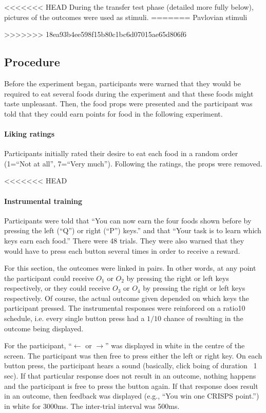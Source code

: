 \documentclass[12pt]{article}
\begin{document}
<<<<<<< HEAD
During the transfer test phase (detailed more fully below), pictures of the
outcomes were used as stimuli. 
=======
Pavlovian stimuli

>>>>>>> 18ea93b4ee598f15b80c1bc6d07015ae65d806f6

\subsection{Procedure}
Before the experiment began, participants were warned that they would be
required to eat several foods during the experiment and that these foods might
taste unpleasant. Then, the food props were presented and the participant was
told that they could earn points for food in the following experiment.

\paragraph{Liking ratings} Participants initially rated their desire to eat
each food in a random order (1=``Not at all'', 7=``Very much''). Following the
ratings, the props were removed. 

<<<<<<< HEAD
\paragraph{Instrumental training} Participants were told that ``You can now
earn the four foods shown before by pressing the left (``Q'') or right (``P'')
keys.'' and that ``Your task is to learn which keys earn each food.'' There were
48 trials. They were also warned that they would have to press each button several times in order to receive a reward. 

For this section, the outcomes were linked in pairs. In other words, at any point the participant could receive $O_1$ or $O_2$ by pressing the right or left keys respectively, or they could receive $O_3$ or $O_4$ by pressing the right or left keys respectively. Of course, the actual outcome given depended on which keys the participant pressed. The instrumental responses were reinforced on a ratio10 schedule, i.e. every single button press had a $1/10$ chance of resulting in the outcome being displayed.

For the participant, ``$\leftarrow$ or $\rightarrow$'' was displayed in
white in the centre of the screen. The participant was then free to press either the left or right key. On each button press, the participant hears a sound (basically, click boing of duration ~1 sec). If that particular response does not result in an outcome, nothing happens and the participant is free to press the button again. If that response does result in an outcome, then feedback was displayed (e.g., ``You win one CRISPS point.'') in white for 3000ms. The inter-trial interval was 500ms.
\end{document}
